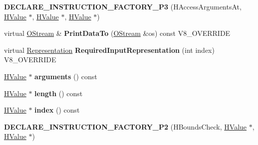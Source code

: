 \begin{DoxyCompactItemize}
\item 
\hypertarget{classv8_1_1internal_1_1_v8___f_i_n_a_l_a1c3064c564a657e461f496f22ff129ed}{}{\bfseries D\+E\+C\+L\+A\+R\+E\+\_\+\+I\+N\+S\+T\+R\+U\+C\+T\+I\+O\+N\+\_\+\+F\+A\+C\+T\+O\+R\+Y\+\_\+\+P3} (H\+Access\+Arguments\+At, \hyperlink{classv8_1_1internal_1_1_h_value}{H\+Value} $\ast$, \hyperlink{classv8_1_1internal_1_1_h_value}{H\+Value} $\ast$, \hyperlink{classv8_1_1internal_1_1_h_value}{H\+Value} $\ast$)\label{classv8_1_1internal_1_1_v8___f_i_n_a_l_a1c3064c564a657e461f496f22ff129ed}

\item 
\hypertarget{classv8_1_1internal_1_1_v8___f_i_n_a_l_ac450dad970b14246be761ccf5004924b}{}virtual \hyperlink{classv8_1_1internal_1_1_o_stream}{O\+Stream} \& {\bfseries Print\+Data\+To} (\hyperlink{classv8_1_1internal_1_1_o_stream}{O\+Stream} \&os) const V8\+\_\+\+O\+V\+E\+R\+R\+I\+D\+E\label{classv8_1_1internal_1_1_v8___f_i_n_a_l_ac450dad970b14246be761ccf5004924b}

\item 
\hypertarget{classv8_1_1internal_1_1_v8___f_i_n_a_l_a6c6d1f37f40b113d8f4062f1ffff7215}{}virtual \hyperlink{classv8_1_1internal_1_1_representation}{Representation} {\bfseries Required\+Input\+Representation} (int index) V8\+\_\+\+O\+V\+E\+R\+R\+I\+D\+E\label{classv8_1_1internal_1_1_v8___f_i_n_a_l_a6c6d1f37f40b113d8f4062f1ffff7215}

\item 
\hypertarget{classv8_1_1internal_1_1_v8___f_i_n_a_l_a841e1ff1334b5f17ab74c5df19e0c27d}{}\hyperlink{classv8_1_1internal_1_1_h_value}{H\+Value} $\ast$ {\bfseries arguments} () const \label{classv8_1_1internal_1_1_v8___f_i_n_a_l_a841e1ff1334b5f17ab74c5df19e0c27d}

\item 
\hypertarget{classv8_1_1internal_1_1_v8___f_i_n_a_l_ab7b83a87df9a2ccda4486746a0b3dd05}{}\hyperlink{classv8_1_1internal_1_1_h_value}{H\+Value} $\ast$ {\bfseries length} () const \label{classv8_1_1internal_1_1_v8___f_i_n_a_l_ab7b83a87df9a2ccda4486746a0b3dd05}

\item 
\hypertarget{classv8_1_1internal_1_1_v8___f_i_n_a_l_ae35cd4b0e5fed0e15fcbbaaad81399c5}{}\hyperlink{classv8_1_1internal_1_1_h_value}{H\+Value} $\ast$ {\bfseries index} () const \label{classv8_1_1internal_1_1_v8___f_i_n_a_l_ae35cd4b0e5fed0e15fcbbaaad81399c5}

\item 
\hypertarget{classv8_1_1internal_1_1_v8___f_i_n_a_l_ad920dcdcae4499f7b8e7514d23e70227}{}{\bfseries D\+E\+C\+L\+A\+R\+E\+\_\+\+I\+N\+S\+T\+R\+U\+C\+T\+I\+O\+N\+\_\+\+F\+A\+C\+T\+O\+R\+Y\+\_\+\+P2} (H\+Bounds\+Check, \hyperlink{classv8_1_1internal_1_1_h_value}{H\+Value} $\ast$, \hyperlink{classv8_1_1internal_1_1_h_value}{H\+Value} $\ast$)\label{classv8_1_1internal_1_1_v8___f_i_n_a_l_ad920dcdcae4499f7b8e7514d23e70227}


\end{DoxyCompactItemize}
